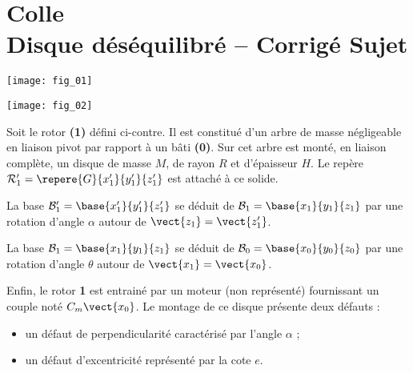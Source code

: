 \chapter*{Colle  \\ 
Disque déséquilibré -- \ifprof Corrigé \else Sujet \fi}

\iflivret {} \else
\ifprof  {} \else \fi
\fi

\setcounter{question}{0}



\begin{marginfigure}
\texttt{[image: fig\_01]}
\end{marginfigure}
\begin{marginfigure}
\texttt{[image: fig\_02]}
\end{marginfigure}
Soit le rotor \textbf{(1)} défini ci-contre. Il est constitué d'un arbre de masse négligeable en liaison pivot par rapport à un bâti \textbf{(0)}. Sur cet arbre est monté, en liaison complète, un disque de masse $M$, de rayon $R$ et d'épaisseur $H$. 
Le repère $\mathcal{R}'_1=\repere{G}{x_1'}{y_1'}{z_1'}$ est attaché à ce solide.

La base $\mathcal{B}'_1=\base{x_1'}{y_1'}{z_1'}$ se déduit de $\mathcal{B}_1=\base{x_1}{y_1}{z_1}$  par une rotation d'angle $\alpha$ autour de $\vect{z_1}= \vect{z_1'}$. 

La base $\mathcal{B}_1=\base{x_1}{y_1}{z_1}$ se déduit de $\mathcal{B}_0=\base{x_0}{y_0}{z_0}$  par une rotation d'angle $\theta$ autour de $\vect{x_1}= \vect{x_0}$. 

Enfin, le rotor \textbf{1} est entrainé par un moteur (non représenté) fournissant un couple noté $C_m\vect{x_0}$. 
Le montage de ce disque présente deux défauts :
\begin{itemize}
\item un défaut de perpendicularité caractérisé par l'angle $\alpha$ ;
\item un défaut d'excentricité représenté par la cote $e$.
\end{itemize}



